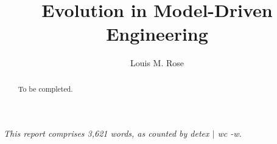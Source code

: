 \documentclass[a4paper,10pt]{article}
\title{Evolution in Model-Driven Engineering}
\author{Louis M. Rose}
\begin{document}
\maketitle

\begin{abstract}
	To be completed.
\end{abstract}

\vspace{2mm}

\begin{center}
  \small{\textit{This report comprises 3,621 words, as counted by detex $|$ wc -w.}}
\end{center}

\tableofcontents

\newpage







\end{document}
